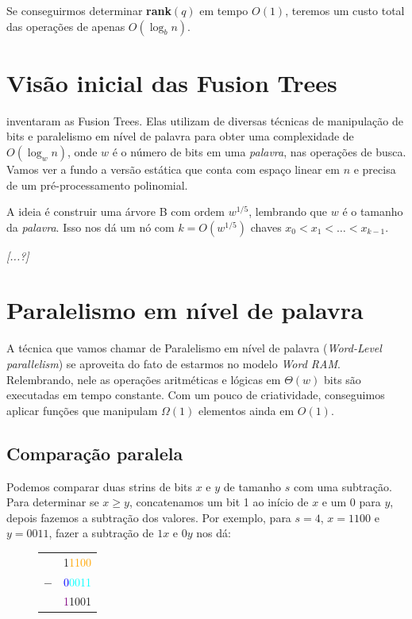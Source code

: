 Se conseguirmos determinar \textbf{rank}$(q)$ em tempo $O(1)$, teremos um custo
total das operações de apenas $O(\log_b n)$. 

\section{Visão inicial das Fusion Trees}

\cite{FrWi93} inventaram as Fusion Trees. Elas utilizam de diversas técnicas de
manipulação de bits e paralelismo em nível de palavra para obter uma
complexidade de $O(\log_w n)$, onde $w$ é o número de bits em uma
\textit{palavra}, nas operações de busca. Vamos ver a fundo a versão estática
que conta com espaço linear em $n$ e precisa de um pré-processamento polinomial.

A ideia é construir uma árvore B com ordem $w^{1/5}$, lembrando que $w$ é o
tamanho da \textit{palavra}. Isso nos dá um nó com $k=O(w^{1/5})$ chaves
$x_0<x_1<\dots<x_{k-1}$. 

\textit{[...?]}

\section{Paralelismo em nível de palavra}

A técnica que vamos chamar de Paralelismo em nível de palavra
(\textit{Word-Level parallelism}) se aproveita do fato de estarmos no modelo
\textit{Word RAM}. Relembrando, nele as operações aritméticas e lógicas em
$\Theta(w)$ bits são executadas em tempo constante. Com um pouco de
criatividade, conseguimos aplicar funções que manipulam $\Omega(1)$ elementos
ainda em $O(1)$.

\subsection{Comparação paralela}

Podemos comparar duas strins de bits $x$ e $y$ de tamanho $s$ com uma subtração.
Para determinar se $x\geq y$, concatenamos um bit 1 ao início de $x$ e um 0 para
$y$, depois fazemos a subtração dos valores. Por exemplo, para $s=4$, $x=1100$ e
$y=0011$, fazer a subtração de $1x$ e $0y$ nos dá:

\begin{figure}[h]
\bf \Large \centering
\begin{tabular}{cc}
& \textcolor{RawSienna}{1}\textcolor{Orange}{1100} \\
$-$ & \textcolor{blue}{0}\textcolor{cyan}{0011} \\
\hline
& \textcolor{Purple}{1}\textcolor{CarnationPink}{1001} 
\end{tabular}
\end{figure}

